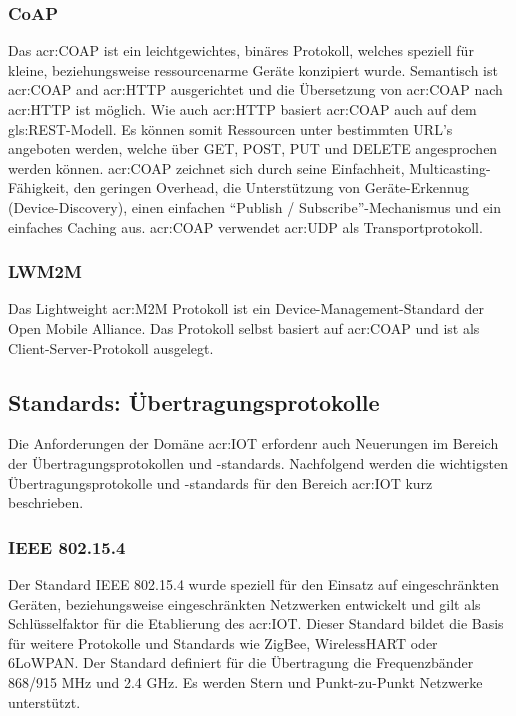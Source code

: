 \subsubsection{CoAP}
Das \gls{acr:COAP} ist ein leichtgewichtes, binäres Protokoll, welches speziell für kleine, beziehungsweise ressourcenarme  Geräte konzipiert wurde. Semantisch ist \gls{acr:COAP} and \gls{acr:HTTP} ausgerichtet und die Übersetzung von \gls{acr:COAP} nach \gls{acr:HTTP} ist möglich. Wie auch \gls{acr:HTTP} basiert \gls{acr:COAP} auch auf dem \gls{gls:REST}-Modell. Es können somit Ressourcen unter bestimmten URL's angeboten werden, welche über GET, POST, PUT und DELETE angesprochen werden können. \gls{acr:COAP} zeichnet sich durch seine Einfachheit, Multicasting-Fähigkeit, den geringen Overhead, die Unterstützung von Geräte-Erkennug (Device-Discovery), einen einfachen "`Publish / Subscribe"'-Mechanismus und ein einfaches Caching aus. \gls{acr:COAP} verwendet \gls{acr:UDP} als Transportprotokoll.


\subsubsection{LWM2M}
Das Lightweight \gls{acr:M2M} Protokoll ist ein Device-Management-Standard der Open Mobile Alliance. Das Protokoll selbst basiert auf \gls{acr:COAP} und ist als Client-Server-Protokoll ausgelegt.


\subsection{Standards: Übertragungsprotokolle}
Die Anforderungen der Domäne \gls{acr:IOT} erfordenr auch Neuerungen im Bereich der Übertragungsprotokollen und -standards. Nachfolgend werden die wichtigsten Übertragungsprotokolle und -standards für den Bereich \gls{acr:IOT} kurz beschrieben.


\subsubsection{IEEE 802.15.4}
Der Standard IEEE 802.15.4 wurde speziell für den Einsatz auf eingeschränkten Geräten, beziehungsweise eingeschränkten Netzwerken entwickelt und gilt als Schlüsselfaktor für die Etablierung des \gls{acr:IOT}. Dieser Standard bildet die Basis für weitere Protokolle und Standards wie ZigBee, WirelessHART oder 6LoWPAN. Der Standard definiert für die Übertragung die Frequenzbänder 868/915 MHz und 2.4 GHz. Es werden Stern und Punkt-zu-Punkt Netzwerke unterstützt.


